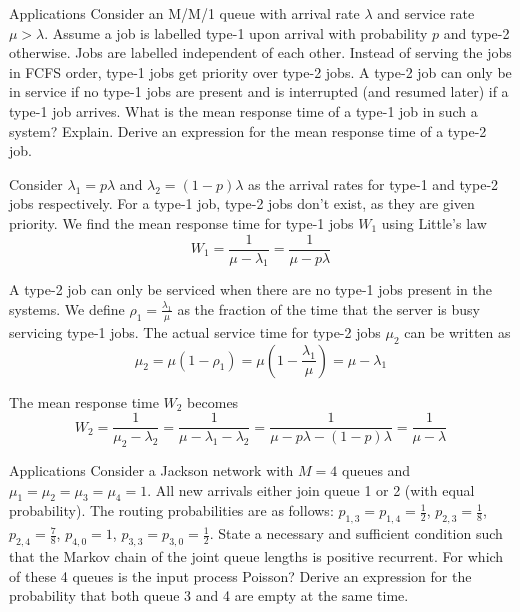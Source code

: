 \begin{problem}{Applications}
    Consider an M/M/1 queue with arrival rate $\lambda$ and service rate $\mu > \lambda$. Assume a job is labelled type-1 upon arrival with probability $p$ and type-2 otherwise. Jobs are labelled independent of each other. Instead of serving the jobs in FCFS order, type-1 jobs get priority over type-2 jobs. A type-2 job can only be in service if no type-1 jobs are present and is interrupted (and resumed later) if a type-1 job arrives. What is the mean response time of a type-1 job in such a system? Explain. Derive an expression for the mean response time of a type-2 job.
\end{problem}
\begin{solution}
  Consider $\lambda_1 = p\lambda$ and $\lambda_2 = (1-p)\lambda$ as the arrival rates for type-1 and type-2 jobs respectively. For a type-1 job, type-2 jobs don't exist, as they are given priority. We find the mean response time for type-1 jobs $W_1$ using Little's law
  \[
    W_1 = \frac{1}{\mu - \lambda_1} = \frac{1}{\mu - p\lambda}
  \]

  A type-2 job can only be serviced when there are no type-1 jobs present in the systems. We define $\rho_1 = \frac{\lambda_1}{\mu}$ as the fraction of the time that the server is busy servicing type-1 jobs. The actual service time for type-2 jobs $\mu_2$ can be written as
  \[
    \mu_2 = \mu(1-\rho_1) = \mu(1-\frac{\lambda_1}{\mu}) = \mu - \lambda_1
  \]

  The mean response time $W_2$ becomes
  \[
    W_2 = \frac{1}{\mu_2 - \lambda_2} = \frac{1}{\mu - \lambda_1 - \lambda_2} = \frac{1}{\mu - p\lambda - (1-p)\lambda} = \frac{1}{\mu-\lambda}
  \]

\end{solution}


\begin{problem}{Applications}
   Consider a Jackson network with $M = 4$ queues and $\mu_1 = \mu_2 = \mu_3 = \mu_4 = 1$. All new arrivals either join queue 1 or 2 (with equal probability). The routing probabilities are as follows: $ p_{1,3} = p_{1,4} = \frac{1}{2}$, $p_{2,3} = \frac{1}{8}$, $p_{2,4} = \frac{7}{8}$, $p_{4,0} = 1$, $p_{3,3} = p_{3,0} = \frac{1}{2}$. State a necessary and sufficient condition such that the Markov chain of the joint queue lengths is positive recurrent. For which of these 4 queues is the input process Poisson? Derive an expression for the probability that both queue 3 and 4 are empty at the same time.
\end{problem}

